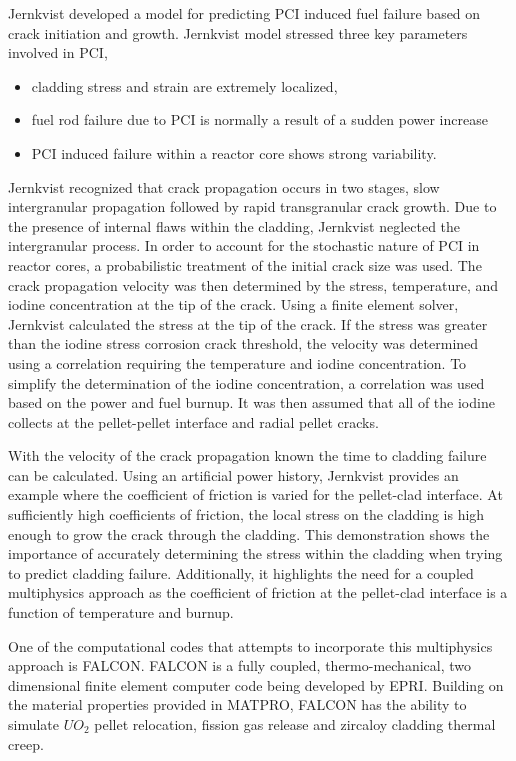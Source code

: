 \documentclass[edeposit,fullpage]{uiucthesis2009}
\begin{document}
Jernkvist \cite{jernkvist_model_1995} developed a model for predicting \gls{PCI} induced fuel failure based on crack initiation and growth.
Jernkvist model stressed three key parameters involved in \gls{PCI},
\begin{itemize} 
\item cladding stress and strain are extremely localized, 
\item fuel rod failure due to \gls{PCI} is normally a result of a sudden power increase 
\item \gls{PCI} induced failure within a reactor core shows strong variability.
\end{itemize}
Jernkvist recognized that crack propagation occurs in two stages, slow intergranular propagation followed by rapid transgranular crack growth.
Due to the presence of internal flaws within the cladding, Jernkvist neglected the intergranular process.
In order to account for the stochastic nature of \gls{PCI} in reactor cores, a probabilistic treatment of the initial crack size was used.
The crack propagation velocity was then determined by the stress, temperature, and iodine concentration at the tip of the crack.
Using a finite element solver, Jernkvist calculated the stress at the tip of the crack.
If the stress was greater than the iodine stress corrosion crack threshold, the velocity was determined using a correlation requiring the temperature and iodine concentration.
To simplify the determination of the iodine concentration, a correlation was used based on the power and fuel burnup.
It was then assumed that all of the iodine collects at the pellet-pellet interface and radial pellet cracks.

With the velocity of the crack propagation known the time to cladding failure can be calculated.
Using an artificial power history, Jernkvist provides an example where the coefficient of friction is varied for the pellet-clad interface.
At sufficiently high coefficients of friction, the local stress on the cladding is high enough to grow the crack through the cladding.
This demonstration shows the importance of accurately determining the stress within the cladding when trying to predict cladding failure.
Additionally, it highlights the need for a coupled multiphysics approach as the coefficient of friction at the pellet-clad interface is a function of temperature and burnup.

One of the computational codes that attempts to incorporate this multiphysics approach is FALCON. %
FALCON is a fully coupled, thermo-mechanical, two dimensional finite element computer code being developed by \gls{EPRI}.
Building on the material properties provided in MATPRO, FALCON has the ability to simulate $UO_2$ pellet relocation, fission gas release and zircaloy cladding thermal creep.
\end{document}
